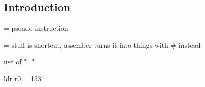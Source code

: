 
\subsection{Introduction}

= pseudo instruction

= stuff is shortcut, assember turns it into things with \# instead

use of "="

ldr r0, =153


